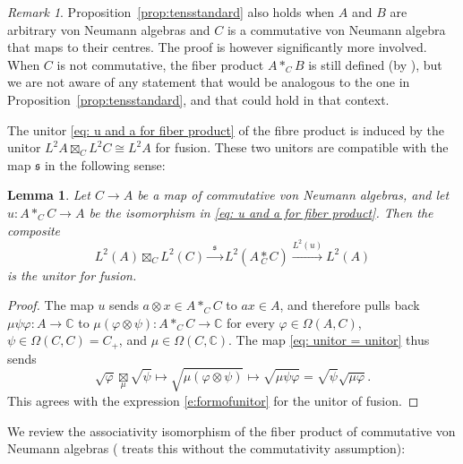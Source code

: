 \documentclass[10pt,a4paper,oneside]{amsart}
\newtheorem{lemma}[theorem]{Lemma}
\theoremstyle{remark}
\newtheorem{remark}[theorem]{Remark}
\theoremstyle{definition}
\newcommand{\rar}{\rightarrow}
\newcommand{\cofu}[1]{\mathop{\boxtimes}_{#1}}
\newcommand{\tens}[1]{\mathop{*}\limits_{#1}}
\newcommand{\Ltwomap}{\mathfrak{s}}
\begin{document}
\begin{remark}
Proposition~\ref{prop:tensstandard} also holds when $A$ and $B$ are arbitrary von Neumann algebras and $C$ is a commutative von Neumann algebra that maps to their centres. The proof is however significantly more involved. When $C$ is not commutative, the fiber product $A \ast_{C} B$ is still defined (by \cite{Timmermann2012}), but we are not aware of any statement that would be analogous to the one in Proposition~\ref{prop:tensstandard}, and that could hold in that context.
\end{remark}

The unitor \eqref{eq: u and a for fiber product}
of the fibre product is induced by the unitor $L^2A \cofu{C} L^2 C \cong L^2A$ for fusion.
These two unitors are compatible with the map $\Ltwomap$ in the following sense:



\begin{lemma}\label{lem: unitor = unitor}
Let $C\rar A$ be a map of commutative von Neumann algebras, and let $u:A\ast_{C}C\to A$ be the isomorphism in \eqref{eq: u and a for fiber product}.
Then the composite
\begin{equation}\label{eq: unitor = unitor}
L^2(A)\cofu{C}L^2(C) \xrightarrow{\,\,\,\Ltwomap\,\,\,}  L^2(A\tens{C}C)
\xrightarrow{L^2(u)} L^2(A)
\end{equation}
is the unitor for fusion.
\end{lemma}

\begin{proof}
The map $u$ sends $a\otimes x\in A\ast_{C}C$ to $ax\in A$, and therefore pulls back $\mu\psi\varphi:A\to \mathbb{C}$ to 
$\mu(\varphi\otimes \psi):A\ast_{C}C\to \mathbb{C}$
for every $\varphi\in \Omega(A,C)$, $\psi\in\Omega(C,C)=C_+$, and $\mu\in\Omega(C,\mathbb C)$.
The map \eqref{eq: unitor = unitor} thus sends
$$\sqrt{\varphi}\underset{\mu}\boxtimes \sqrt{\psi}\mapsto
\sqrt{\mu(\varphi\otimes \psi)}
\mapsto \sqrt{\mu\psi\varphi} = \sqrt{\psi}\sqrt{\mu\varphi}.
$$
This agrees with the expression \eqref{e:formofunitor} for the unitor of fusion.
\end{proof}

We review the associativity isomorphism of the fiber product of commutative von Neumann algebras (\cite[Proposition 9.2.8]{Timmermann2008} treats this without the commutativity assumption):
\end{document}
